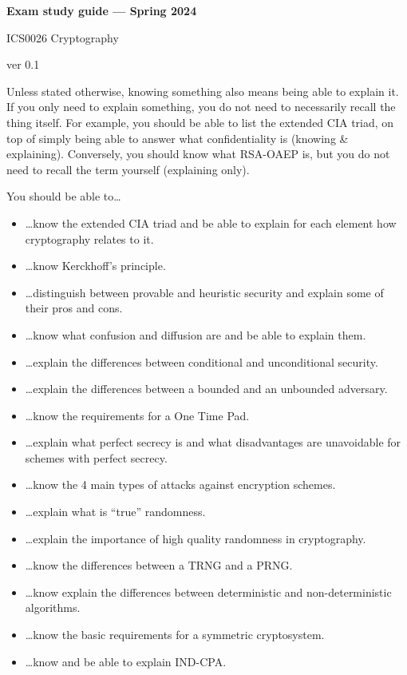 \documentclass[usegeometry,parskip=half]{scrartcl}
\begin{document}
\begin{center}
  \textbf{Exam study guide --- Spring 2024}

  ICS0026 Cryptography

  ver 0.1
\end{center}

Unless stated otherwise, knowing something also means being able to explain it.
If you only need to explain something, you do not need to necessarily recall the thing itself.
For example, you should be able to list the extended CIA triad, on top of simply being able to answer what confidentiality is (knowing \& explaining).
Conversely, you should know what RSA-OAEP is, but you do not need to recall the term yourself (explaining only).

You should be able to\dots{}
\begin{itemize}
  \item \dots{}know the extended CIA triad and be able to explain for each element how cryptography relates to it.
  \item \dots{}know Kerckhoff's principle.
  \item \dots{}distinguish between provable and heuristic security and explain some of their pros and cons.
  \item \dots{}know what confusion and diffusion are and be able to explain them.
  \item \dots{}explain the differences between conditional and unconditional security.
  \item \dots{}explain the differences between a bounded and an unbounded adversary.
  \item \dots{}know the requirements for a One Time Pad.
  \item \dots{}explain what perfect secrecy is and what disadvantages are unavoidable for schemes with perfect secrecy.
  \item \dots{}know the 4 main types of attacks against encryption schemes.
  \item \dots{}explain what is \enquote{true} randomness.
  \item \dots{}explain the importance of high quality randomness in cryptography.
  \item \dots{}know the differences between a TRNG and a PRNG.
  \item \dots{}know explain the differences between deterministic and non-deterministic algorithms.
  \item \dots{}know the basic requirements for a symmetric cryptosystem.
  \item \dots{}know and be able to explain IND-CPA.

\end{itemize}
\end{document}
